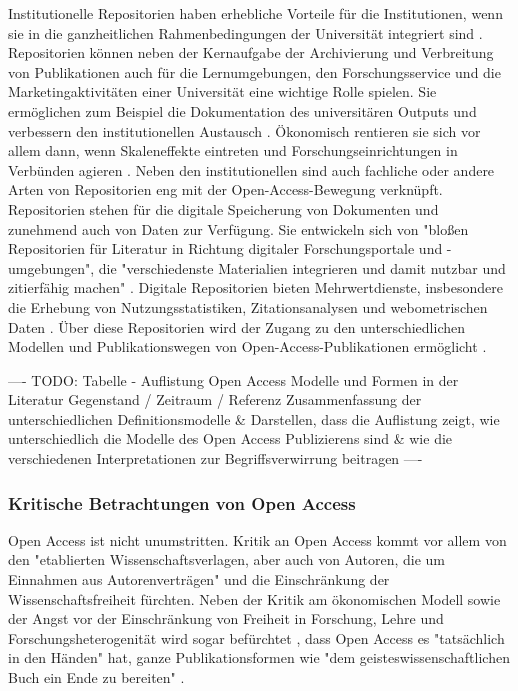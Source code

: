Institutionelle Repositorien haben erhebliche Vorteile für die Institutionen, wenn sie in die ganzheitlichen Rahmenbedingungen der Universität integriert sind \cite{Steele_2006}. Repositorien können neben der Kernaufgabe der Archivierung und Verbreitung von Publikationen auch für die Lernumgebungen, den Forschungsservice und die Marketingaktivitäten einer Universität eine wichtige Rolle spielen. Sie ermöglichen zum Beispiel die Dokumentation des universitären Outputs und verbessern den institutionellen Austausch \cite{Steele_2006}. Ökonomisch rentieren sie sich vor allem dann, wenn Skaleneffekte eintreten und Forschungseinrichtungen in Verbünden agieren \cite{Blythe_2005}. Neben den institutionellen sind auch fachliche oder andere Arten von Repositorien eng mit der Open-Access-Bewegung verknüpft. Repositorien stehen für die digitale Speicherung von Dokumenten und zunehmend auch von Daten zur Verfügung. Sie entwickeln sich von "bloßen Repositorien für Literatur in Richtung digitaler Forschungsportale und -umgebungen", die "verschiedenste Materialien integrieren und damit nutzbar und zitierfähig machen" \cite{Schmidt_2009}. Digitale Repositorien bieten Mehrwertdienste, insbesondere die Erhebung von Nutzungsstatistiken, Zitationsanalysen und webometrischen Daten \cite{Jahn_2011} \cite{Mayr_2005}. Über diese Repositorien wird der Zugang zu den unterschiedlichen Modellen und Publikationswegen von Open-Access-Publikationen ermöglicht \cite{Suber_2015}.

---- TODO: Tabelle - Auflistung Open Access  Modelle und Formen in der Literatur Gegenstand / Zeitraum / Referenz Zusammenfassung der unterschiedlichen Definitionsmodelle & Darstellen, dass die Auflistung zeigt, wie unterschiedlich die Modelle des Open Access Publizierens sind & wie die verschiedenen Interpretationen zur Begriffsverwirrung beitragen ----

\subsubsection{Kritische Betrachtungen von Open Access}

Open Access ist nicht unumstritten. Kritik an Open Access kommt vor allem von den "etablierten Wissenschaftsverlagen, aber auch von Autoren, die um Einnahmen aus Autorenverträgen" \cite{Schirmbacher_2007} und die Einschränkung der Wissenschaftsfreiheit fürchten. Neben der Kritik am ökonomischen Modell sowie der Angst vor der Einschränkung von Freiheit in Forschung, Lehre und Forschungsheterogenität wird sogar befürchtet \cite{Szczesny_2014}, dass Open Access es "tatsächlich in den Händen" hat, ganze Publikationsformen wie "dem geisteswissenschaftlichen Buch ein Ende zu bereiten" \cite{Hirschi_2015}.

